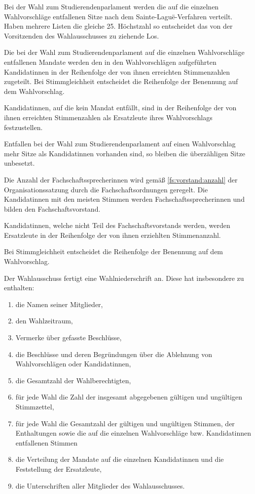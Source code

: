 \begin{jurdoc}
\label{wahl:sitzverteilungstupa}
Bei der Wahl zum Studierendenparlament werden die auf die einzelnen Wahlvorschläge entfallenen Sitze nach dem Sainte-Laguë-Verfahren verteilt. Haben mehrere Listen die gleiche 25. Höchstzahl so entscheidet das von der Vorsitzenden des Wahlausschusses zu ziehende Los.

Die bei der Wahl zum Studierendenparlament auf die einzelnen Wahlvorschläge entfallenen Mandate werden den in den Wahlvorschlägen aufgeführten Kandidatinnen in der Reihenfolge der von ihnen erreichten Stimmenzahlen zugeteilt. Bei Stimmgleichheit entscheidet die Reihenfolge der Benennung auf dem Wahlvorschlag.

Kandidatinnen, auf die kein Mandat entfällt, sind in der Reihenfolge der von ihnen erreichten Stimmenzahlen als Ersatzleute ihres Wahlvorschlags festzustellen. 

Entfallen bei der Wahl zum Studierendenparlament auf einen Wahlvorschlag mehr Sitze als Kandidatinnen vorhanden sind, so bleiben die überzähligen Sitze unbesetzt.

\label{wahl:fsvorstaende}
Die Anzahl der Fachschaftssprecherinnen wird gemäß \ref{fs:vorstand:anzahl} der Organisationssatzung durch die Fachschaftsordnungen geregelt. Die Kandidatinnen mit den meisten Stimmen werden Fachschaftssprecherinnen und bilden den Fachschaftsvorstand. 

Kandidatinnen, welche nicht Teil des Fachschaftsvorstands werden, werden Ersatzleute in der Reihenfolge der von ihnen erziehlten Stimmenanzahl. 

Bei Stimmgleichheit entscheidet die Reihenfolge der Benennung auf dem Wahlvorschlag.

\label{wahl:wahlniederschrift}
Der Wahlausschuss fertigt eine Wahlniederschrift an. Diese hat insbesondere zu enthalten: 
\begin{enumerate}
    \item die Namen seiner Mitglieder,
    \item den Wahlzeitraum,
    \item Vermerke über gefasste Beschlüsse,
    \item die Beschlüsse und deren Begründungen über die Ablehnung von Wahlvorschlägen oder Kandidatinnen,
    \item die Gesamtzahl der Wahlberechtigten,
    \item für jede Wahl die Zahl der insgesamt abgegebenen gültigen und ungültigen Stimmzettel,
    \item für jede Wahl die Gesamtzahl der gültigen und ungültigen Stimmen, der Enthaltungen sowie die auf die einzelnen Wahlvorschläge bzw. Kandidatinnen entfallenen Stimmen
    \item die Verteilung der Mandate auf die einzelnen Kandidatinnen und die Feststellung der Ersatzleute,
    \item die Unterschriften aller Mitglieder des Wahlausschusses.
\end{enumerate}


\end{jurdoc}
